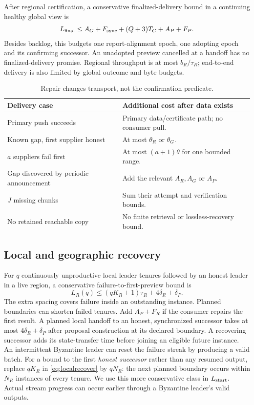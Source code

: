 \documentclass[11pt,a4paper,onecolumn]{article}
\theoremstyle{remark}\newtheorem{example}[definition]{Example}
\begin{document}
After regional certification, a conservative finalized-delivery bound in a
continuing healthy global view is
\begin{equation}\label{eq:deliver}
 L_{\rm final}\leq A_G+F_{\rm sync}+(Q+3)T_G+A_P+F_P.
\end{equation}
Besides backlog, this budgets one report-alignment epoch, one adopting epoch
and its confirming successor. An unadopted preview cancelled at a handoff has
no finalized-delivery promise. Regional throughput is at most $b_R/\tau_R$;
end-to-end delivery is also limited by global outcome and byte budgets.

\begin{table}[htbp]\centering\small
\begin{tabularx}{\textwidth}{@{}p{}Y@{}}\toprule
Delivery case & Additional cost after data exists\\\midrule
Primary push succeeds & Primary data/certificate path; no consumer pull.\\
Known gap, first supplier honest & At most $\theta_R$ or $\theta_G$.\\
$a$ suppliers fail first & At most $(a+1)\theta$ for one bounded range.\\
Gap discovered by periodic announcement & Add the relevant $A_R,A_G$ or $A_P$.\\
$J$ missing chunks & Sum their attempt and verification bounds.\\
No retained reachable copy & No finite retrieval or lossless-recovery bound.\\\bottomrule
\end{tabularx}
\caption{Repair changes transport, not the confirmation predicate.}
\end{table}

\subsection{Local and geographic recovery}\label{sec:recoverybounds}
For $q$ continuously unproductive local leader tenures followed by an honest
leader in a live region,
a conservative failure-to-first-preview bound is
\begin{equation}\label{eq:localrecover}
 L_R(q)\leq(qK_R+1)\tau_R+4\delta_R+\delta_P.
\end{equation}
The extra spacing covers failure inside an outstanding instance. Planned
boundaries can shorten failed tenures. Add $A_P+F_R$ if the consumer repairs
the first result. A planned local handoff to an honest, synchronized successor
takes at most $4\delta_R+\delta_P$ after proposal construction at its declared
boundary. A recovering successor adds its state-transfer time before joining
an eligible future instance.
An intermittent Byzantine leader can reset the failure streak by producing a
valid batch. For a bound to the first \emph{honest successor} rather than any
resumed output, replace $qK_R$ in \eqref{eq:localrecover} by $qN_R$:
the next planned boundary occurs within $N_R$ instances of every tenure.
We use this more conservative class in $L_{\rm start}$. Actual stream progress
can occur earlier through a Byzantine leader's valid outputs.
\end{document}
